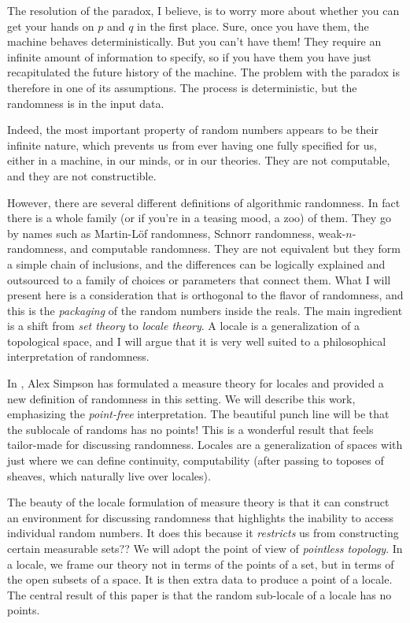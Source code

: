 \documentclass[14pt]{extarticle}
\begin{document}
The resolution of the paradox, I believe, is to worry more about whether you can get your hands on $p$ and $q$ in the first place. Sure, once you have them, the machine behaves deterministically. But you can't have them! They require an infinite amount of information to specify, so if you have them you have just recapitulated the future history of the machine. The problem with the paradox is therefore in one of its assumptions. The process is deterministic, but the randomness is in the input data.

Indeed, the most important property of random numbers appears to be their infinite nature, which prevents us from ever having one fully specified for us, either in a machine, in our minds, or in our theories. They are not computable, and they are not constructible.

However, there are several different definitions of algorithmic randomness. In fact there is a whole family (or if you're in a teasing mood, a zoo) of them. They go by names such as Martin-Löf randomness, Schnorr randomness, weak-$n$-randomness, and computable randomness. They are not equivalent but they form a simple chain of inclusions, and the differences can be logically explained and outsourced to a family of choices or parameters that connect them. What I will present here is a consideration that is orthogonal to the flavor of randomness, and this is the \emph{packaging} of the random numbers inside the reals. The main ingredient is a shift from \emph{set theory} to \emph{locale theory}. A locale is a generalization of a topological space, and I will argue that it is very well suited to a philosophical interpretation of randomness.

In \cite{simpson}, Alex Simpson has formulated a measure theory for locales and provided a new definition of randomness in this setting. We will describe this work, emphasizing the \emph{point-free} interpretation. The beautiful punch line will be that the sublocale of randoms has no points! This is a wonderful result that feels tailor-made for discussing randomness. Locales are a generalization of spaces with just  where we can define continuity, computability (after passing to toposes of sheaves, which naturally live over locales). 

The beauty of the locale formulation of measure theory is that it can construct an environment for discussing randomness that highlights the inability to access individual random numbers. It does this because it \emph{restricts} us from constructing certain measurable sets?? We will adopt the point of view of \emph{pointless topology}. In a locale, we frame our theory not in terms of the points of a set, but in terms of the open subsets of a space. It is then extra data to produce a point of a locale. The central result of this paper is that the random sub-locale of a locale has no points.
\end{document}

